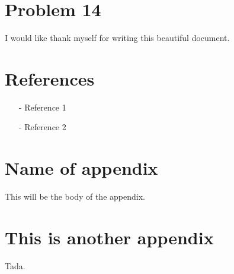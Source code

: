 \documentclass[reprint,english,notitlepage]{revtex4-1}  %
\begin{document}
\section{Problem 14}



\begin{acknowledgments}  %
I would like thank myself for writing this beautiful document.
\end{acknowledgments}


\section*{References}  %
\begin{itemize}
\item[-]Reference 1
\item[-]Reference 2
\end{itemize}

\newpage
\appendix
\section{Name of appendix}
This will be the body of the appendix.
\section{This is another appendix}\label{appendix}
Tada.



\end{document}
